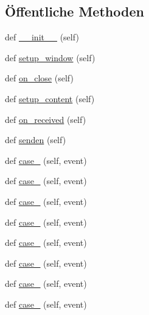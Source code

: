 \subsection*{Öffentliche Methoden}
\begin{DoxyCompactItemize}
\item 
def \hyperlink{class_f_i_n_a_l___g_u_i___w_l_a_n_1_1_w_l_a_n_ae64f0875afe3067b97ba370b354b9213}{\+\_\+\+\_\+init\+\_\+\+\_\+} (self)
\item 
def \hyperlink{class_f_i_n_a_l___g_u_i___w_l_a_n_1_1_w_l_a_n_a9fe79fb8dbee1e660dc971b137c55f3f}{setup\+\_\+window} (self)
\item 
def \hyperlink{class_f_i_n_a_l___g_u_i___w_l_a_n_1_1_w_l_a_n_a7e20a417210b832ce9e307ce5dc0f2a8}{on\+\_\+close} (self)
\item 
def \hyperlink{class_f_i_n_a_l___g_u_i___w_l_a_n_1_1_w_l_a_n_ab6e6fe2e785e29f0597e4fcdd3ec9063}{setup\+\_\+content} (self)
\item 
def \hyperlink{class_f_i_n_a_l___g_u_i___w_l_a_n_1_1_w_l_a_n_acf1affbfdbdb68b3abc9033871a107d0}{on\+\_\+received} (self)
\item 
def \hyperlink{class_f_i_n_a_l___g_u_i___w_l_a_n_1_1_w_l_a_n_afeb2bad2d8c6b65fe0b779ced76908df}{senden} (self)
\item 
def \hyperlink{class_f_i_n_a_l___g_u_i___w_l_a_n_1_1_w_l_a_n_a56a0117dca51418bc547938098845f9c}{case\+\_} (self, event)
\item 
def \hyperlink{class_f_i_n_a_l___g_u_i___w_l_a_n_1_1_w_l_a_n_ab319a20d08a9c0885566a7fc381db73a}{case\+\_} (self, event)
\item 
def \hyperlink{class_f_i_n_a_l___g_u_i___w_l_a_n_1_1_w_l_a_n_a1305b30e32f00b42a0dc48cf6035a5c6}{case\+\_} (self, event)
\item 
def \hyperlink{class_f_i_n_a_l___g_u_i___w_l_a_n_1_1_w_l_a_n_a7adf7de62369cc6e2c43abdcfb28ac98}{case\+\_} (self, event)
\item 
def \hyperlink{class_f_i_n_a_l___g_u_i___w_l_a_n_1_1_w_l_a_n_aabab537872285d8e714e0eee4910b172}{case\+\_} (self, event)
\item 
def \hyperlink{class_f_i_n_a_l___g_u_i___w_l_a_n_1_1_w_l_a_n_a03bf56233c58c2e78e884a5ef7d5c7e2}{case\+\_} (self, event)
\item 
def \hyperlink{class_f_i_n_a_l___g_u_i___w_l_a_n_1_1_w_l_a_n_a32a43998c22b533d37d0f33e396ec854}{case\+\_} (self, event)
\item 
def \hyperlink{class_f_i_n_a_l___g_u_i___w_l_a_n_1_1_w_l_a_n_a780ab1218c323b1542a37be09f955196}{case\+\_} (self, event)

\end{DoxyCompactItemize}
